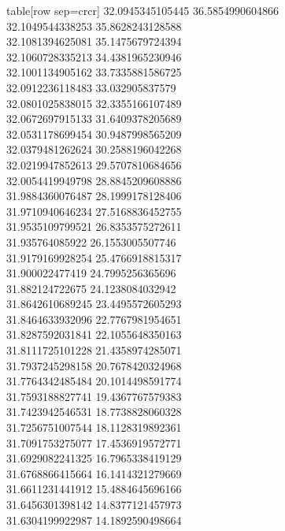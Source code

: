   table[row sep=crcr]{%
32.0945345105445	36.5854990604866\\
32.1049544338253	35.8628243128588\\
32.1081394625081	35.1475679724394\\
32.1060728335213	34.4381965230946\\
32.1001134905162	33.7335881586725\\
32.0912236118483	33.032905837579\\
32.0801025838015	32.3355166107489\\
32.0672697915133	31.6409378205689\\
32.0531178699454	30.9487998565209\\
32.0379481262624	30.2588196042268\\
32.0219947852613	29.5707810684656\\
32.0054419949798	28.8845209608886\\
31.9884360076487	28.1999178128406\\
31.9710940646234	27.5168836452755\\
31.9535109799521	26.8353575272611\\
31.935764085922	26.1553005507746\\
31.9179169928254	25.4766918815317\\
31.900022477419	24.7995256365696\\
31.882124722675	24.1238084032942\\
31.8642610689245	23.4495572605293\\
31.8464633932096	22.7767981954651\\
31.8287592031841	22.1055648350163\\
31.8111725101228	21.4358974285071\\
31.7937245298158	20.7678420324968\\
31.7764342485484	20.1014498591774\\
31.7593188827741	19.4367767579383\\
31.7423942546531	18.7738828060328\\
31.7256751007544	18.1128319892361\\
31.7091753275077	17.4536919572771\\
31.6929082241325	16.7965338419129\\
31.6768866415664	16.1414321279669\\
31.6611231441912	15.4884645696166\\
31.6456301398142	14.8377121457973\\
31.6304199922987	14.1892590498664\\
}
